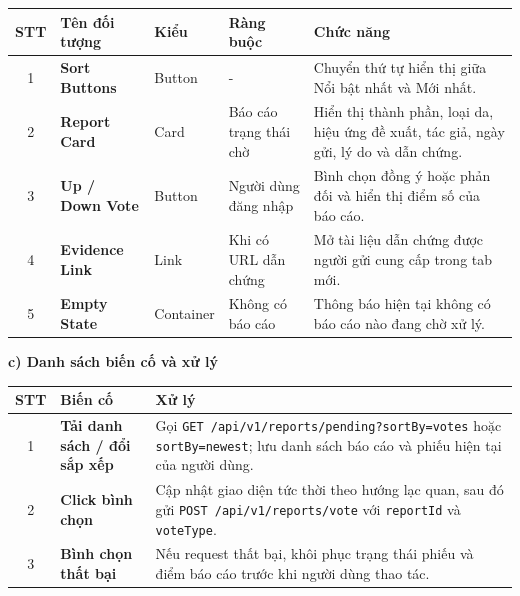 \documentclass[12pt,a4paper]{article}
\begin{document}
\begin{center}
\renewcommand{\arraystretch}{1.5}
\begin{tabularx}{\textwidth}{|c|l|l|l|X|}
\hline
\rowcolor{blue!20}
\textbf{STT} & \textbf{Tên đối tượng} & \textbf{Kiểu} & \textbf{Ràng buộc} & \textbf{Chức năng} \\ \hline

1 & \textbf{Sort Buttons} & Button & - & Chuyển thứ tự hiển thị giữa Nổi bật nhất và Mới nhất. \\ \hline

2 & \textbf{Report Card} & Card & Báo cáo trạng thái chờ & Hiển thị thành phần, loại da, hiệu ứng đề xuất, tác giả, ngày gửi, lý do và dẫn chứng. \\ \hline

3 & \textbf{Up / Down Vote} & Button & Người dùng đăng nhập & Bình chọn đồng ý hoặc phản đối và hiển thị điểm số của báo cáo. \\ \hline

4 & \textbf{Evidence Link} & Link & Khi có URL dẫn chứng & Mở tài liệu dẫn chứng được người gửi cung cấp trong tab mới. \\ \hline

5 & \textbf{Empty State} & Container & Không có báo cáo & Thông báo hiện tại không có báo cáo nào đang chờ xử lý. \\ \hline

\end{tabularx}
\end{center}

\textbf{c) Danh sách biến cố và xử lý}

\begin{center}
\renewcommand{\arraystretch}{1.5}
\begin{tabularx}{\textwidth}{|c|l|X|}
\hline
\rowcolor{blue!20}
\textbf{STT} & \textbf{Biến cố} & \textbf{Xử lý} \\ \hline

1 & \textbf{Tải danh sách / đổi sắp xếp} & Gọi \texttt{GET /api/v1/reports/pending?sortBy=votes} hoặc \texttt{sortBy=newest}; lưu danh sách báo cáo và phiếu hiện tại của người dùng. \\ \hline

2 & \textbf{Click bình chọn} & Cập nhật giao diện tức thời theo hướng lạc quan, sau đó gửi \texttt{POST /api/v1/reports/vote} với \texttt{reportId} và \texttt{voteType}. \\ \hline

3 & \textbf{Bình chọn thất bại} & Nếu request thất bại, khôi phục trạng thái phiếu và điểm báo cáo trước khi người dùng thao tác. \\ \hline

\end{tabularx}
\end{center}
\end{document}

